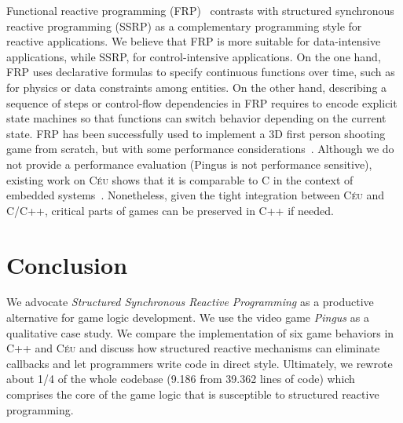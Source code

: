 \documentclass[times,twocolumn,final]{elsarticle}
\newcommand{\CEU}{\textsc{C\'{e}u}\xspace}
\begin{document}
Functional reactive programming (FRP)~\cite{frp.fran} contrasts with
structured synchronous reactive programming (SSRP) as a complementary
programming style for reactive applications.
%
We believe that FRP is more suitable for data-intensive applications, while 
SSRP, for control-intensive applications.
%
On the one hand, FRP uses declarative formulas to specify continuous functions 
over time, such as for physics or data constraints among entities.
%
On the other hand, describing a sequence of steps or control-flow dependencies
in FRP requires to encode explicit state machines so that functions can switch
behavior depending on the current state.
%
FRP has been successfully used to implement a 3D first person shooting game
from scratch, but with some performance considerations~\cite{games.frag}.
%
Although we do not provide a performance evaluation (Pingus is not performance
sensitive), existing work on \CEU shows that it is comparable to C in the
context of embedded systems~\cite{ceu.sensys13}.
Nonetheless, given the tight integration between \CEU and C/C++, critical parts
of games can be preserved in C++ if needed.

\section{Conclusion}
\label{sec.conclusion}

We advocate \emph{Structured Synchronous Reactive Programming} as a productive
alternative for game logic development.
%
We use the video game \emph{Pingus} as a qualitative case study.
We compare the implementation of six game behaviors in C++ and \CEU and discuss
how structured reactive mechanisms can eliminate callbacks and let programmers
write code in direct style.
%
Ultimately, we rewrote about 1/4 of the whole codebase (9.186 from 39.362 lines
of code) which comprises the core of the game logic that is susceptible to
structured reactive programming.
\end{document}
